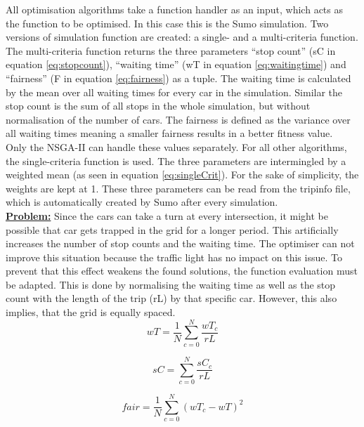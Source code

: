 \documentclass[./\jobname.tex]{subfiles}
\begin{document}
All optimisation algorithms take a function handler as an input, which acts as the function to be optimised. In this case this is the Sumo simulation. Two versions of simulation function are created: a single- and a multi-criteria function. The multi-criteria function returns the three parameters ``stop count'' (sC in equation \ref{eq:stopcount}), ``waiting time'' (wT in equation \ref{eq:waitingtime}) and ``fairness'' (F in equation \ref{eq:fairness}) as a tuple. The waiting time is calculated by the mean over all waiting times for every car in the simulation. Similar the stop count is the sum of all stops in the whole simulation, but without normalisation of the number of cars. The fairness is defined as the variance over all waiting times meaning a smaller fairness results in a better fitness value. \\

Only the NSGA-II can handle these values separately. For all other algorithms, the single-criteria function is used. The three parameters are intermingled by a weighted mean (as seen in equation \ref{eq:singleCrit}). For the sake of simplicity, the weights are kept at 1. These three parameters can be read from the tripinfo file, which is automatically created by Sumo after every simulation.\\

\textbf{\underline{Problem:}} Since the cars can take a turn at every intersection, it might be possible that car gets trapped in the grid for a longer period. This artificially increases the number of stop counts and the waiting time. The optimiser can not improve this situation because the traffic light has no impact on this issue. To prevent that this effect weakens the found solutions, the function evaluation must be adapted. This is done by normalising the waiting time as well as the stop count with the length of the trip (rL) by that specific car. However, this also implies, that the grid is equally spaced. \\

\begin{equation}
wT = \frac{1}{N} \sum_{c = 0}^{N} \frac{wT_c}{rL}
\label{eq:waitingtime}
\end{equation}


\begin{equation}
sC = \sum_{c = 0}^{N} \frac{sC_c}{rL}
\label{eq:stopcount}
\end{equation}


\begin{equation}
fair = \frac{1}{N} \sum_{c = 0}^{N} (wT_c - wT)^2
\label{eq:fairness}
\end{equation}
\end{document}
